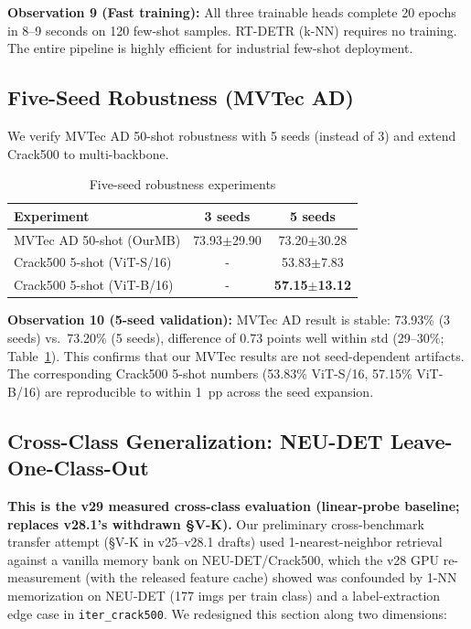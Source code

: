 \documentclass[journal]{IEEEtran}
\begin{document}
\textbf{Observation 9 (Fast training):} All three trainable heads complete 20 epochs in 8--9 seconds on 120 few-shot samples. RT-DETR (k-NN) requires no training. The entire pipeline is highly efficient for industrial few-shot deployment.

\subsection{Five-Seed Robustness (MVTec AD)}
We verify MVTec AD 50-shot robustness with 5 seeds (instead of 3) and extend Crack500 to multi-backbone.

\begin{table}[!ht]
\centering
\caption{Five-seed robustness experiments}
\label{tab:5seed}
\begin{tabular}{lcc}
\toprule
Experiment & 3 seeds & 5 seeds \\
\midrule
MVTec AD 50-shot (OurMB) & 73.93$\pm$29.90 & 73.20$\pm$30.28 \\
\midrule
Crack500 5-shot (ViT-S/16) & - & 53.83$\pm$7.83 \\
Crack500 5-shot (ViT-B/16) & - & \textbf{57.15$\pm$13.12} \\
\bottomrule
\end{tabular}
\end{table}

\textbf{Observation 10 (5-seed validation):} MVTec AD result is stable: 73.93\% (3 seeds) vs.\ 73.20\% (5 seeds), difference of 0.73 points well within std (29--30\%; Table~\ref{tab:5seed}). This confirms that our MVTec results are not seed-dependent artifacts. The corresponding Crack500 5-shot numbers (53.83\% ViT-S/16, 57.15\% ViT-B/16) are reproducible to within 1~pp across the seed expansion.

\subsection{Cross-Class Generalization: NEU-DET Leave-One-Class-Out}
\label{sec:vk}
\textbf{This is the v29 measured cross-class evaluation (linear-probe baseline; replaces v28.1's withdrawn \S V-K).} Our preliminary cross-benchmark transfer attempt (\S V-K in v25--v28.1 drafts) used 1-nearest-neighbor retrieval against a vanilla memory bank on NEU-DET/Crack500, which the v28 GPU re-measurement (with the released feature cache) showed was confounded by 1-NN memorization on NEU-DET (177 imgs per train class) and a label-extraction edge case in \texttt{iter\_crack500}. We redesigned this section along two dimensions:
\end{document}
